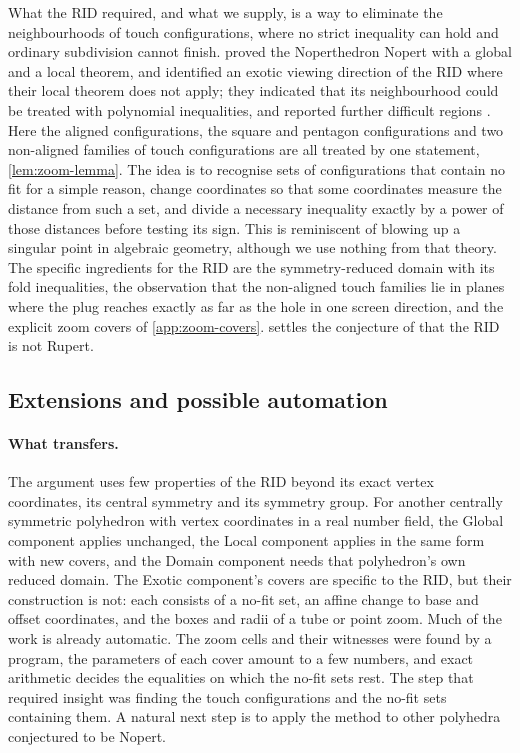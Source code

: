 What the RID required, and what we supply, is a way to eliminate the
neighbourhoods of touch configurations, where no strict inequality can
hold and ordinary subdivision cannot finish.
\citet{SteiningerYurkevichNopertV2} proved the Noperthedron Nopert with a
global and a local theorem, and identified an exotic viewing direction
of the RID where their local theorem does not apply; they indicated that its neighbourhood could be treated with
polynomial inequalities, and reported further difficult regions
\citep[Section~9.1]{SteiningerYurkevichNopertV2}. Here the aligned
configurations, the square and pentagon configurations and two
non-aligned families of touch configurations are all treated by one
statement, \cref{lem:zoom-lemma}. The idea is to recognise sets of
configurations that contain no fit for a simple reason, change coordinates
so that some coordinates measure the distance from such a set, and divide
a necessary inequality exactly by a power of those distances before
testing its sign. This is reminiscent of blowing up a singular point in
algebraic geometry, although we use nothing from that theory. The
specific ingredients for the RID are the symmetry-reduced domain with its
fold inequalities, the observation that the non-aligned touch families lie
in planes where the plug reaches exactly as far as the hole in one screen
direction, and the explicit zoom covers of \cref{app:zoom-covers}.
 settles the conjecture of \citet{SteiningerYurkevich2023}
that the RID is not Rupert.

\subsection{Extensions and possible automation}\label{subsec:extensions-and-possible-automation}

\paragraph{What transfers.}
The argument uses few properties of the RID beyond its exact vertex
coordinates, its central symmetry and its symmetry group. For another
centrally symmetric polyhedron with vertex coordinates in a real number
field, the Global component applies unchanged, the Local component applies
in the same form with new covers, and the Domain component needs that
polyhedron's own reduced domain. The Exotic component's covers are
specific to the RID, but their construction is not: each consists of a
no-fit set, an affine change to base and offset coordinates, and the boxes
and radii of a tube or point zoom. Much of the work is already automatic.
The zoom cells and their witnesses were found by a program, the parameters
of each cover amount to a few numbers, and exact arithmetic decides the
equalities on which the no-fit sets rest. The step that required insight
was finding the touch configurations and the no-fit sets containing them.
A natural next step is to apply the method to other polyhedra conjectured
to be Nopert.

